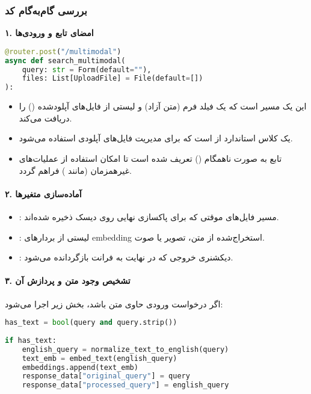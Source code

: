 \documentclass{article}
\begin{document}
\subsubsection{بررسی گام‌به‌گام کد}

\textbf{۱. امضای تابع و ورودی‌ها}

\begin{latin}
\begin{lstlisting}[language=Python]
@router.post("/multimodal")
async def search_multimodal(
    query: str = Form(default=""),
    files: List[UploadFile] = File(default=[])
):
\end{lstlisting}
\end{latin}
\begin{itemize}
    \item این یک مسیر  است که یک فیلد فرم  (متن آزاد) و لیستی از فایل‌های آپلودشده () را دریافت می‌کند.
    \item {} یک کلاس استاندارد از  است که برای مدیریت فایل‌های آپلودی استفاده می‌شود.
    \item تابع به صورت ناهمگام () تعریف شده است تا امکان استفاده از عملیات‌های غیرهمزمان (مانند ) فراهم گردد.
\end{itemize}

\paragraph{۲. آماده‌سازی متغیرها}
\begin{itemize}
    \item {}: مسیر فایل‌های موقتی که برای پاکسازی نهایی روی دیسک ذخیره شده‌اند.
    \item {}: لیستی از بردارهای embedding استخراج‌شده از متن، تصویر یا صوت.
    \item {}: دیکشنری خروجی که در نهایت به فرانت بازگردانده می‌شود.
\end{itemize}

\paragraph{۳. تشخیص وجود متن و پردازش آن}
اگر درخواست ورودی حاوی متن باشد، بخش زیر اجرا می‌شود:

\begin{latin}
\begin{lstlisting}[language=Python]
has_text = bool(query and query.strip())
 
if has_text:
    english_query = normalize_text_to_english(query)
    text_emb = embed_text(english_query)
    embeddings.append(text_emb)
    response_data["original_query"] = query
    response_data["processed_query"] = english_query
\end{lstlisting}
\end{latin}
\end{document}
